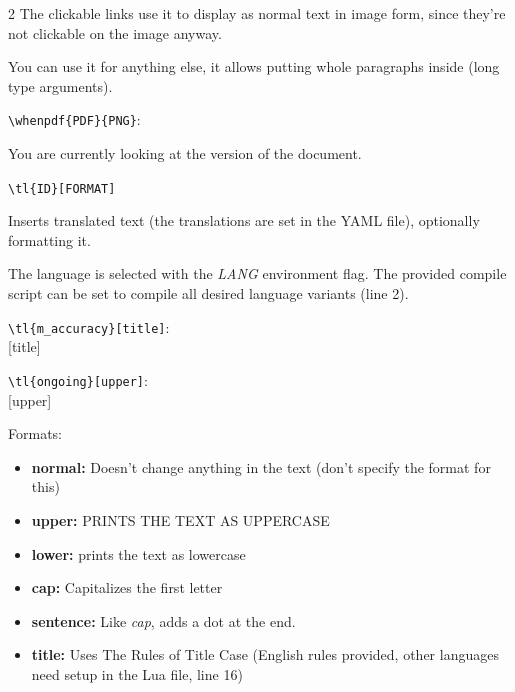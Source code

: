 \begin{paracol}{2}
    The clickable links use it to display as normal text in image form, since they're not clickable on the image anyway.

    You can use it for anything else, it allows putting whole paragraphs inside {\scriptsize(long type arguments)}.

    \begingroup\color{gray}\verb!\whenpdf{PDF}{PNG}!:\endgroup

    You are currently looking at the \textbf{} version of the document.

    \vspace{4mm}

    \verb!\tl{ID}[FORMAT]!

    Inserts translated text (the translations are set in the YAML file), optionally formatting it.

    The language is selected with the \textit{LANG} environment flag.
    The provided compile script can be set to compile all desired language variants (line 2).

    \switchcolumn*

    \begin{center}
      \color{page}

      \begingroup\color{lightgray}\verb!\tl{m_accuracy}[title]!:\endgroup\\
      [title]

      \begingroup\color{lightgray}\verb!\tl{ongoing}[upper]!:\endgroup\\
      [upper]

    \end{center}

    \switchcolumn

    Formats:
    \begin{itemize}
      \item \textbf{normal:} Doesn't change anything in the text (don't specify the format for this)
      \item \textbf{upper:} PRINTS THE TEXT AS UPPERCASE
      \item \textbf{lower:} prints the text as lowercase
      \item \textbf{cap:} Capitalizes the first letter
      \item \textbf{sentence:} Like \emph{cap}, adds a dot at the end.
      \item \textbf{title:} Uses The Rules of Title Case (English rules provided, other languages need setup in the Lua file, line 16)
    \end{itemize}


\end{paracol}
